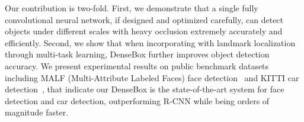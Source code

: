 Our contribution is two-fold. First, we demonstrate that a single fully convolutional neural network, if designed and optimized carefully, can detect objects under different scales with heavy occlusion extremely accurately and efficiently. Second, we show that when incorporating with landmark localization through multi-task learning, DenseBox further improves object detection accuracy. We present experimental results on public benchmark datasets including MALF (Multi-Attribute Labeled Faces) face detection~\cite{faceevaluation15} and KITTI car detection~\cite{Geiger2012CVPR}, that indicate our DenseBox is the state-of-the-art system for face detection and car detection, outperforming R-CNN while being orders of magnitude faster.



